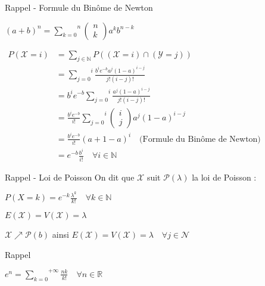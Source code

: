 \documentclass[a4paper, 12pt]{article}
\begin{document}
\begin{rappel}{Rappel - Formule du Binôme de Newton}
{
\Large
\begin{center}
$(a + b)^n = \overset{n}{\underset{k = 0}{\sum}} \left ( \begin{array}{c} n \\ k \end{array} \right ) a^k b^{n - k}$
\end{center}
}
\end{rappel}

$
\begin{aligned}
P (\mathcal{X} = i) &= \underset{j \in \mathbb{N}}{\sum} P ((\mathcal{X} = i) \cap (\mathcal{Y} = j)) \\
&= \overset{i}{\underset{j = 0}{\sum}} \frac{b^i e^{-b} a^j (1 - a)^{i - j}}{j! (i - j)!} \\
&= b^i e^{-b} \overset{i}{\underset{j = 0}{\sum}} \frac{a^j (1 - a)^{i - j}}{j! (i - j)!} \\
&= \frac{b^i e^{-b}}{i!}  \overset{i}{\underset{j = 0}{\sum}} \left ( \begin{array}{c} i \\ j \end{array} \right ) a^j (1 - a)^{i - j} \\
&= \frac{b^i e^{-b}}{i!} (a + 1 - a)^i \quad \text{(Formule du Binôme de Newton)} \\
&\boxed{= e^{-b} \frac{b^i}{i!}} \quad \forall i \in \mathbb{N}
\end{aligned}
$ \\

\begin{rappel}{Rappel - Loi de Poisson}
On dit que $\mathcal{X}$ suit $\mathcal{P} (\lambda)$ la loi de Poisson :
{
\Large
\begin{center}
$\boxed{P (X = k) = e^{-k} \frac{\lambda^k}{k!} \quad \forall k \in \mathbb{N}}$ \\
\end{center}
}
$E(\mathcal{X}) = V(\mathcal{X}) = \lambda$
\end{rappel}

$\mathcal{X} \nearrow \mathcal{P} (b)$ ainsi $E(\mathcal{X}) = V(\mathcal{X}) = \lambda \quad \forall j \in \mathcal{N}$ \\

\begin{rappel}{Rappel}
{
\Large
\begin{center}
$e^n = \overset{+\infty}{\underset{k = 0}{\sum}} \frac{nk}{k!} \quad \forall n \in \mathbb{R}$
\end{center}
}
\end{rappel}
\end{document}
